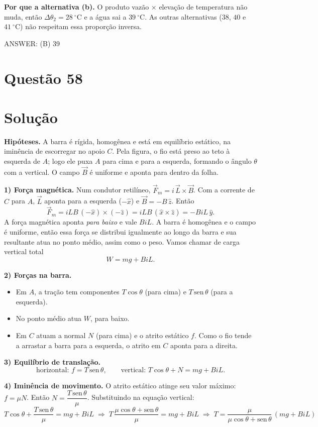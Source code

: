 \documentclass{article}%
\begin{document}
\textbf{Por que a alternativa (b).} O produto vazão $\times$ elevação de temperatura não muda, então $\Delta\theta_2=28\ ^\circ\text{C}$ e a água sai a $39\ ^\circ\text{C}$. As outras alternativas ($38$, $40$ e $41\ ^\circ\text{C}$) não respeitam essa proporção inversa.

ANSWER: (B) 39%
\newpage%
\section*{Questão 58}

\section*{Solução}

\textbf{Hipóteses.} A barra é rígida, homogênea e está em equilíbrio estático, na iminência de escorregar no apoio $C$. Pela figura, o fio está preso ao teto à esquerda de $A$; logo ele puxa $A$ para cima e para a esquerda, formando o ângulo $\theta$ com a vertical. O campo $\vec B$ é uniforme e aponta para dentro da folha.

\textbf{1) Força magnética.} Num condutor retilíneo, $\vec F_m = i\,\vec L\times\vec B$. Com a corrente de $C$ para $A$, $\vec L$ aponta para a esquerda ($-\hat x$) e $\vec B=-B\,\hat z$. Então
\[
\vec F_m = iLB\,(-\hat x)\times(-\hat z)=iLB\,(\hat x\times\hat z)=-BiL\,\hat y .
\]
A força magnética aponta \emph{para baixo} e vale $BiL$. A barra é homogênea e o campo é uniforme, então essa força se distribui igualmente ao longo da barra e sua resultante atua no ponto médio, assim como o peso. Vamos chamar de carga vertical total
\[
W = mg + BiL .
\]

\textbf{2) Forças na barra.}
\begin{itemize}
\item Em $A$, a tração tem componentes $T\cos\theta$ (para cima) e $T\,\text{sen}\,\theta$ (para a esquerda).
\item No ponto médio atua $W$, para baixo.
\item Em $C$ atuam a normal $N$ (para cima) e o atrito estático $f$. Como o fio tende a arrastar a barra para a esquerda, o atrito em $C$ aponta para a direita.
\end{itemize}

\textbf{3) Equilíbrio de translação.}
\[
\text{horizontal: } f = T\,\text{sen}\,\theta, \qquad \text{vertical: } T\cos\theta + N = mg+BiL .
\]

\textbf{4) Iminência de movimento.} O atrito estático atinge seu valor máximo: $f=\mu N$. Então $N=\dfrac{T\,\text{sen}\,\theta}{\mu}$. Substituindo na equação vertical:
\[
T\cos\theta+\frac{T\,\text{sen}\,\theta}{\mu}=mg+BiL
\;\Longrightarrow\;
T\,\frac{\mu\cos\theta+\text{sen}\,\theta}{\mu}=mg+BiL
\;\Longrightarrow\;
\boxed{T=\frac{\mu}{\mu\cos\theta+\text{sen}\,\theta}\,(mg+BiL)}
\]
\end{document}
